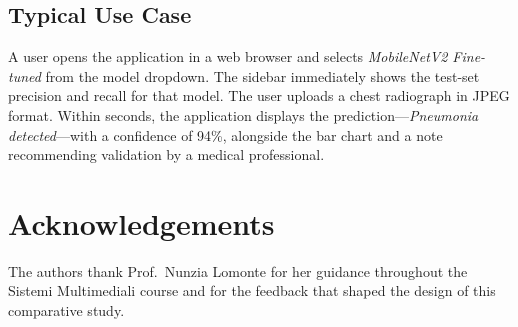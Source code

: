 \documentclass[conference]{IEEEtran}
\begin{document}
\subsection{Typical Use Case}

A user opens the application in a web browser and selects
\emph{MobileNetV2 Fine-tuned} from the model dropdown.
The sidebar immediately shows the test-set precision and
recall for that model. The user uploads a chest radiograph
in JPEG format. Within seconds, the application displays
the prediction—\emph{Pneumonia detected}—with a confidence
of 94\%, alongside the bar chart and a note recommending
validation by a medical professional.

\section*{Acknowledgements}
The authors thank Prof.\ Nunzia Lomonte for her guidance
throughout the Sistemi Multimediali course and for the
feedback that shaped the design of this comparative study.
\end{document}
